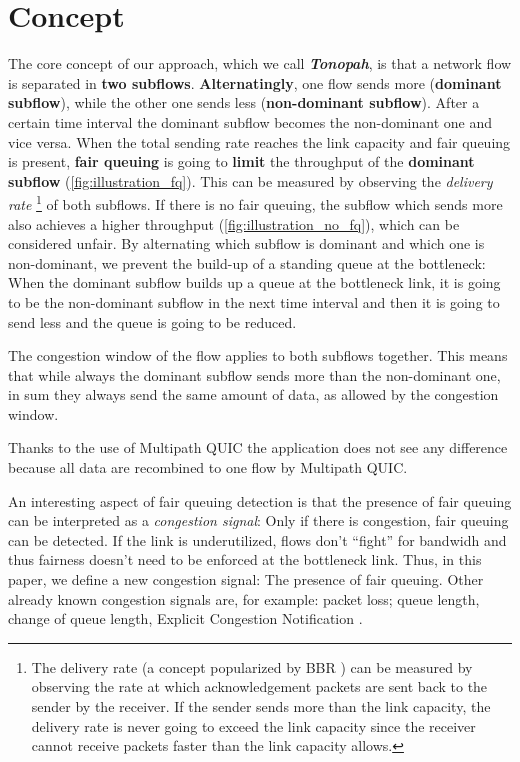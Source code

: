 \documentclass[conference]{IEEEtran}
\begin{document}
\section{Concept}

The core concept of our approach, which we call \textbf{\textit{Tonopah}}, is that a network flow is separated in \textbf{two subflows}. 
\textbf{Alternatingly}, one flow sends more (\textbf{dominant subflow}), while the other one sends less (\textbf{non-dominant subflow}). After a certain time interval the dominant subflow becomes the non-dominant one and vice versa. 
When the total sending rate reaches the link capacity and fair queuing is present, \textbf{fair queuing} is going to \textbf{limit} the throughput of the \textbf{dominant subflow} (\autoref{fig:illustration_fq}). This can be measured by observing the \textit{delivery rate}
\footnote{The delivery rate (a concept popularized by BBR \cite{cardwell_bbr_2016}) can be measured by observing the rate at which acknowledgement packets are sent back to the sender by the receiver.
If the sender sends more than the link capacity, the delivery rate is never going to exceed the link capacity since the receiver cannot receive packets faster than the link capacity allows. 
}
of both subflows. If there is no fair queuing, the subflow which sends more also achieves a higher throughput (\autoref{fig:illustration_no_fq}), which can be considered unfair. By alternating which subflow is dominant and which one is non-dominant, we prevent the build-up of a standing queue at the bottleneck: 
When the dominant subflow builds up a queue at the bottleneck link, it is going to be the non-dominant subflow in the next time interval and then it is going to send less and the queue is going to be reduced. 

The congestion window of the flow applies to both subflows together. This means that while always the dominant subflow sends more than the non-dominant one, in sum they always send the same amount of data, as allowed by the congestion window.

Thanks to the use of Multipath QUIC \cite{liu_multipath_2022} the application does not see any difference because all data are recombined to one flow by Multipath QUIC. 

An interesting aspect of fair queuing detection is that the presence of fair queuing can be interpreted as a \textit{congestion signal}: 
Only if there is congestion, fair queuing can be detected. If the link is underutilized, flows don't ``fight'' for bandwidh and thus fairness doesn't need to be enforced at the bottleneck link. 
Thus, in this paper, we define a new congestion signal: The presence of fair queuing. Other already known congestion signals are, for example: 
packet loss; queue length, change of queue length, Explicit Congestion Notification \cite{mathis_relentless_2009,hutchison_revisiting_2011}. 
\end{document}
